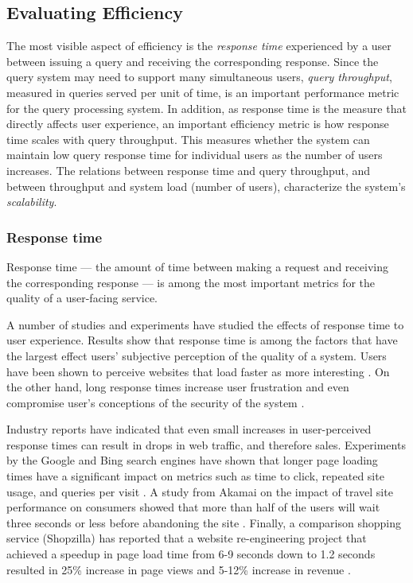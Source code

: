 
\subsection{Evaluating Efficiency}

The most visible aspect of efficiency is the \textit{response time} experienced by a user between issuing a query and
receiving the corresponding response.
Since the query system may need to support many simultaneous users, \textit{query throughput}, measured in queries served
per unit of time, is an important performance metric for the query processing system.
In addition, as response time is the measure that directly affects user experience, an important efficiency metric is
how response time scales with query throughput.
This measures whether the system can maintain low query response time for individual users as the number of users
increases.
The relations between response time and query throughput, and between throughput and system load (number of users),
characterize the system's \textit{scalability}.

\subsubsection{Response time}
Response time --- the amount of time between making a request and receiving the corresponding response ---
is among the most important metrics for the quality of a user-facing service.

A number of studies and experiments have studied the effects of response time to user experience.
Results show that response time is among the factors that have the largest effect users' subjective perception of the
quality of a system.
Users have been shown to perceive websites that load faster as more interesting \cite{ramsay/retrievaltimesinvestigation}.
On the other hand, long response times increase user frustration \cite{ceaparu:userfrustration} and even compromise
user's conceptions of the security of the system \cite{bouch:qualityeyebeholder}.

Industry reports have indicated that even small increases in user-perceived response times can result in drops in web
traffic, and therefore sales.
Experiments by the Google and Bing search engines have shown that longer page loading times have a significant impact on
metrics such as time to click, repeated site usage, and queries per visit \cite{schurman:rerformanceuserimpact}.
A study from Akamai on the impact of travel site performance on consumers showed that more than half of the users will
wait three seconds or less before abandoning the site \cite{akamai:travelsiteperformance}.
Finally, a comparison shopping service (Shopzilla) has reported that a website re-engineering project that achieved a
speedup in page load time from 6-9 seconds down to 1.2 seconds resulted in 25\% increase in page views and 5-12\%
increase in revenue \cite{dixon:shopzillasiteredo}.

